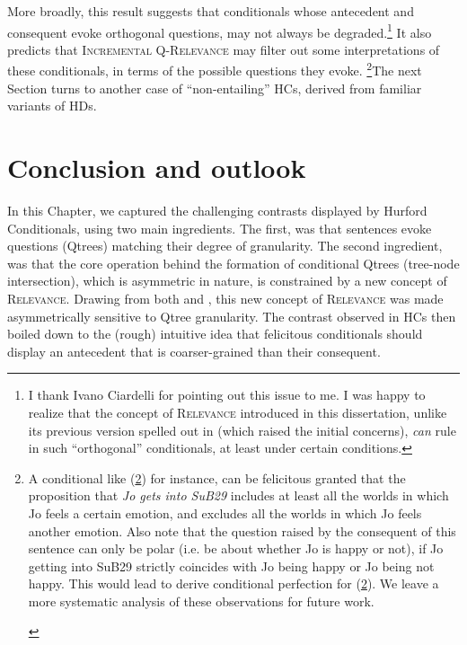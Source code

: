 More broadly, this result suggests that conditionals whose antecedent and consequent evoke orthogonal questions, may not always be degraded.\footnote{I thank Ivano Ciardelli for pointing out this issue to me. I was happy to realize that the concept of \textsc{Relevance} introduced in this dissertation, unlike its previous version spelled out in \citet{HenotMortier2024a} (which raised the initial concerns), \textit{can} rule in such ``orthogonal'' conditionals, at least under certain conditions.} It also predicts that \textsc{Incremental Q-Relevance} may filter out some interpretations of these conditionals, in terms of the possible questions they evoke. \footnote{A conditional like (\ref{ex6:orthogonal-conditional}) for instance, can be felicitous granted that the proposition that \textit{Jo gets into SuB29} includes at least all the worlds in which Jo feels a certain emotion, and excludes all the worlds in which Jo feels another emotion. Also note that the question raised by the consequent of this sentence can only be polar (i.e. be about whether Jo is happy or not), if Jo getting into SuB29 strictly coincides with Jo being happy or Jo being not happy. This would lead to derive conditional perfection for (\ref{ex6:orthogonal-conditional}). We leave a more systematic analysis of these observations for future work.

\begin{exe}
	\label{ex6:orthogonal-conditional}
\end{exe}}The next Section turns to another case of ``non-entailing'' HCs, derived from familiar variants of HDs.



\section{Conclusion and outlook}\label{sec6:ccl}


In this Chapter, we captured the challenging contrasts displayed by Hurford Conditionals, using two main ingredients. The first, was that sentences evoke questions (Qtrees) matching their degree of granularity. The second ingredient, was that the core operation behind the formation of conditional Qtrees (tree-node intersection), which is asymmetric in nature, is constrained by a new concept of \textsc{Relevance}. Drawing from both \citet{Lewis1988} and \citet{Roberts2012}, this new concept of \textsc{Relevance} was made asymmetrically sensitive to Qtree granularity. The contrast observed in HCs then boiled down to the (rough) intuitive idea that felicitous conditionals should display an antecedent that is coarser-grained than their consequent.\\

